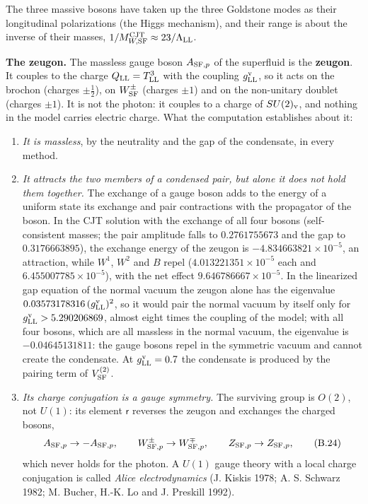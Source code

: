 \documentclass[
  10pt,
]{article}
\providecommand{\tightlist}{%
  \setlength{\itemsep}{0pt}\setlength{\parskip}{0pt}}
\begin{document}
The three massive bosons have taken up the three Goldstone modes as
their longitudinal polarizations (the Higgs mechanism), and their range
is about the inverse of their masses,
\(1/M^{\rm CJT}_{W,{\rm SF}}\approx23/\Lambda_{\rm LL}\).

\textbf{The zeugon.} The massless gauge boson \(A_{{\rm SF},p}\) of the
superfluid is the \textbf{zeugon}. It couples to the charge
\(Q_{\rm LL}=T^3_{\rm LL}\) with the coupling \(g^{\rm v}_{\rm LL}\), so
it acts on the brochon (charges \(\pm\tfrac12\)), on \(W^\pm_{\rm SF}\)
(charges \(\pm1\)) and on the non-unitary doublet (charges \(\pm1\)). It
is not the photon: it couples to a charge of \(SU(2)_{\rm v}\), and
nothing in the model carries electric charge. What the computation
establishes about it:

\begin{enumerate}
\def\labelenumi{\arabic{enumi}.}
\tightlist
\item
  \emph{It is massless}, by the neutrality and the gap of the
  condensate, in every method.
\item
  \emph{It attracts the two members of a condensed pair, but alone it
  does not hold them together.} The exchange of a gauge boson adds to
  the energy of a uniform state its exchange and pair contractions with
  the propagator of the boson. In the CJT solution with the exchange of
  all four bosons (self-consistent masses; the pair amplitude falls to
  \(0.2761755673\) and the gap to \(0.3176663895\)), the exchange energy
  of the zeugon is \(-4.834663821\times10^{-5}\), an attraction, while
  \(W^1\), \(W^2\) and \(B\) repel (\(4.013221351\times10^{-5}\) each
  and \(6.455007785\times10^{-5}\)), with the net effect
  \(9.646786667\times10^{-5}\). In the linearized gap equation of the
  normal vacuum the zeugon alone has the eigenvalue
  \(0.03573178316\,(g^{\rm v}_{\rm LL})^2\), so it would pair the normal
  vacuum by itself only for \(g^{\rm v}_{\rm LL}>5.290206869\), almost
  eight times the coupling of the model; with all four bosons, which are
  all massless in the normal vacuum, the eigenvalue is
  \(-0.04645131811\): the gauge bosons repel in the symmetric vacuum and
  cannot create the condensate. At \(g^{\rm v}_{\rm LL}=0.7\) the
  condensate is produced by the pairing term of \(V^{(2)}_{\rm SF}\).
\item
  \emph{Its charge conjugation is a gauge symmetry.} The surviving group
  is \(O(2)\), not \(U(1)\): its element \(\mathsf r\) reverses the
  zeugon and exchanges the charged bosons,
  \[A_{{\rm SF},p}\to-A_{{\rm SF},p},\qquad W^\pm_{{\rm SF},p}\to W^\mp_{{\rm SF},p},\qquad Z_{{\rm SF},p}\to Z_{{\rm SF},p},\tag{B.24}\]
  which never holds for the photon. A \(U(1)\) gauge theory with a local
  charge conjugation is called \emph{Alice electrodynamics} (J. Kiskis
  1978; A. S. Schwarz 1982; M. Bucher, H.-K. Lo and J. Preskill 1992).
\end{enumerate}
\end{document}
